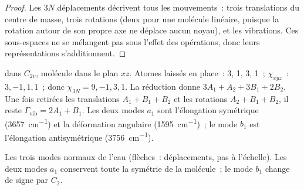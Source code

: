 \begin{proof}
Les $3N$ déplacements décrivent tous les mouvements~: trois translations
du centre de masse, trois rotations (deux pour une molécule linéaire,
puisque la rotation autour de son propre axe ne déplace aucun noyau), et
les vibrations. Ces sous-espaces ne se mélangent pas sous l'effet des
opérations, donc leurs représentations s'additionnent.
\end{proof}

\begin{example}[L'eau]\label{ex:b3:group-theory-applied:water}
 dans $C_{2v}$, molécule dans le plan $xz$. Atomes laissés en
place~: 3, 1, 3, 1~;
$\chi_{xyz}$~: $3, -1, 1, 1$~; donc $\chi_{3N} = 9, -1, 3, 1$. La
réduction donne $3A_1 +
A_2 + 3B_1 + 2B_2$. Une fois retirées les translations $A_1 + B_1 + B_2$
et les rotations $A_2 + B_1 + B_2$,
il reste $\Gamma_{\mathrm{vib}} = 2A_1 + B_1$. Les deux modes $a_1$ sont
l'élongation symétrique
(\qty{3657}{cm^{-1}}) et la déformation angulaire (\qty{1595}{cm^{-1}})~;
le mode $b_1$ est l'élongation antisymétrique (\qty{3756}{cm^{-1}}).
\end{example}

\begin{omfigure}

{\small Les trois modes normaux de l'eau (flèches~: déplacements, pas à
l'échelle). Les deux modes $a_1$ conservent toute la symétrie de la
molécule~; le mode $b_1$ change de signe par $C_2$.}
\end{omfigure}

